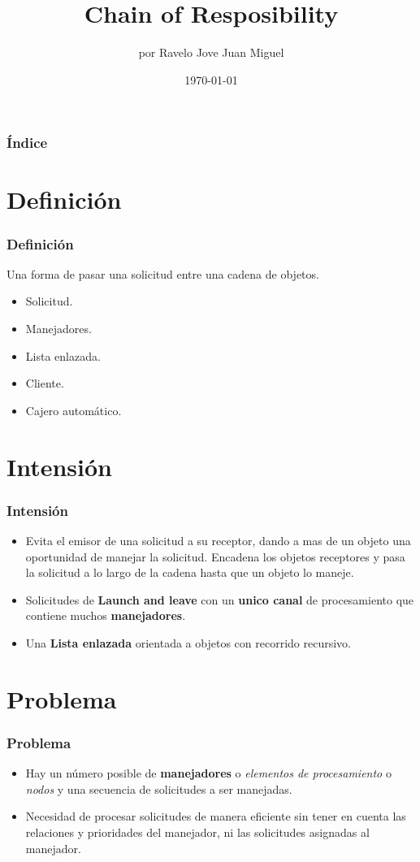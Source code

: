 \documentclass[xcolor=dvipsnames]{beamer}
\title{Chain of Resposibility}
\author{por Ravelo Jove Juan Miguel}
\date{\today}
\begin{document}
\begin{frame}
 \titlepage
\end{frame}

\begin{frame}
\frametitle{Índice}
\tableofcontents[pausesections]

\end{frame}

\section{Definici\'on}
\begin{frame}
 \frametitle{Definici\'on}
 Una forma de pasar una solicitud entre una cadena de objetos.
  \begin{itemize}
 \item Solicitud.
 \item Manejadores.
 \item Lista enlazada.
 \item Cliente.
 \item Cajero autom\'atico.
  \end{itemize}
\end{frame}

\section{Intensi\'on}
\begin{frame}
 \frametitle{Intensi\'on}
\begin{itemize}
 \item Evita el emisor de una solicitud a su receptor, dando a mas de un objeto una oportunidad de manejar la solicitud. Encadena los objetos receptores y pasa la solicitud a lo largo de la cadena hasta que un objeto lo maneje.
 \item Solicitudes de \textbf{Launch and leave} con un \textbf{unico canal} de procesamiento que contiene muchos \textbf{manejadores}.
 \item Una \textbf{Lista enlazada} orientada a objetos con recorrido recursivo.
\end{itemize}
\end{frame}

\section{Problema}
\begin{frame}
  \frametitle{Problema}
\begin{itemize}
 \item Hay un n\'umero posible de \textbf{manejadores} o \emph{elementos de procesamiento} o \emph{nodos} y una secuencia de solicitudes a ser manejadas.
 \item Necesidad de procesar solicitudes de manera eficiente sin tener en cuenta las relaciones y prioridades del manejador, ni las solicitudes asignadas al manejador.
\end{itemize}
\end{frame}
\end{document}
